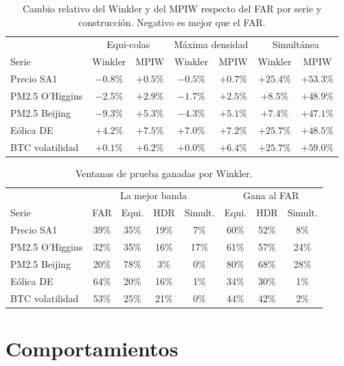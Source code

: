 \begin{table}[H]
\centering\small
\setlength{\tabcolsep}{3pt}
\caption{Cambio relativo del Winkler y del MPIW respecto del FAR por serie y construcción. Negativo es mejor que el FAR.}
\label{tab:aneD_bloqueB_ganancia}
\begin{tabular}{l cc cc cc}
\hline
 & \multicolumn{2}{c}{Equi-colas} & \multicolumn{2}{c}{Máxima densidad} & \multicolumn{2}{c}{Simultánea} \\
Serie & Winkler & MPIW & Winkler & MPIW & Winkler & MPIW \\
\hline
Precio SA1 & $-0.8\%$ & $+0.5\%$ & $-0.5\%$ & $+0.7\%$ & $+25.4\%$ & $+53.3\%$ \\
PM2.5 O'Higgins & $-2.5\%$ & $+2.9\%$ & $-1.7\%$ & $+2.5\%$ & $+8.5\%$ & $+48.9\%$ \\
PM2.5 Beijing & $-9.3\%$ & $+5.3\%$ & $-4.3\%$ & $+5.1\%$ & $+7.4\%$ & $+47.1\%$ \\
Eólica DE & $+4.2\%$ & $+7.5\%$ & $+7.0\%$ & $+7.2\%$ & $+25.7\%$ & $+48.5\%$ \\
BTC volatilidad & $+0.1\%$ & $+6.2\%$ & $+0.0\%$ & $+6.4\%$ & $+25.7\%$ & $+59.0\%$ \\
\hline
\end{tabular}
\end{table}

\begin{table}[H]
\centering\small
\setlength{\tabcolsep}{3.5pt}
\caption{Ventanas de prueba ganadas por Winkler.}
\label{tab:aneD_bloqueB_ventanas}
\begin{tabular}{l cccc ccc}
\hline
 & \multicolumn{4}{c}{La mejor banda} & \multicolumn{3}{c}{Gana al FAR} \\
Serie & FAR & Equi. & HDR & Simult. & Equi. & HDR & Simult. \\
\hline
Precio SA1 & 39\% & 35\% & 19\% & 7\% & 60\% & 52\% & 8\% \\
PM2.5 O'Higgins & 32\% & 35\% & 16\% & 17\% & 61\% & 57\% & 24\% \\
PM2.5 Beijing & 20\% & 78\% & 3\% & 0\% & 80\% & 68\% & 28\% \\
Eólica DE & 64\% & 20\% & 16\% & 1\% & 34\% & 30\% & 1\% \\
BTC volatilidad & 53\% & 25\% & 21\% & 0\% & 44\% & 42\% & 2\% \\
\hline
\end{tabular}
\end{table}

\section{Comportamientos}
\label{aneD_00_04_comportamientos}

